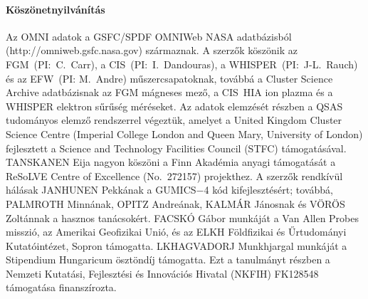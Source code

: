 \documentclass[b5paper,10pt]{article}
\begin{document}
\paragraph{Köszönetnyilvánítás} Az OMNI adatok a GSFC/SPDF OMNIWeb NASA adatbázisból (http://omniweb.gsfc.nasa.gov) származnak. A szerzők köszönik az FGM~(PI:~C.~Carr), a CIS~(PI:~I.~Dandouras), a WHISPER~(PI:~J-L.~Rauch) és az EFW~(PI: M.~Andre) műszercsapatoknak, továbbá a Cluster Science Archive adatbázisnak az FGM mágneses mező, a CIS~HIA ion plazma és a WHISPER elektron sűrűség méréseket. Az adatok elemzését részben a  QSAS tudományos elemző rendszerrel végeztük, amelyet a United Kingdom Cluster Science Centre (Imperial College London and Queen Mary, University of London) fejlesztett a Science and Technology Facilities Council (STFC) támogatásával. TANSKANEN Eija nagyon köszöni a Finn Akadémia anyagi támogatását a ReSoLVE Centre of Excellence (No.~272157) projekthez. A szerzők rendkívül hálásak JANHUNEN Pekkának a GUMICS$-$4 kód kifejlesztésért; továbbá, PALMROTH Minnának, OPITZ Andreának, KALM{\'A}R J{\'a}nosnak és V{\"O}R{\"O}S Zolt{\'a}nnak a hasznos tanácsokért. FACSKÓ Gábor munkáját a Van Allen Probes misszió, az Amerikai Geofizikai Unió, és az ELKH Földfizikai és Űrtudományi Kutatóintézet, Sopron támogatta. LKHAGVADORJ Munkhjargal munkáját a Stipendium Hungaricum ösztöndíj támogatta. Ezt a tanulmányt részben a Nemzeti Kutatási, Fejlesztési és Innovációs Hivatal (NKFIH) FK128548 támogatása finanszírozta.



\end{document}
